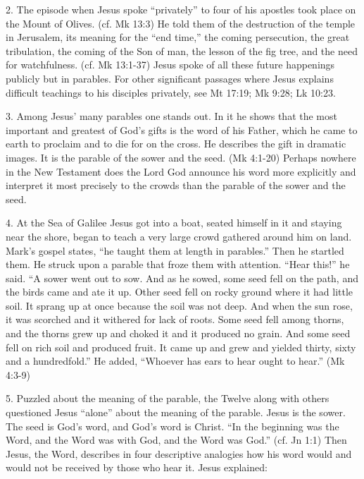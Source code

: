\documentclass[oneside]{book}
\begin{document}
2. The episode when Jesus spoke ``privately'' to four of his apostles took place
on the Mount of Olives. (cf. Mk 13:3) He told them of the destruction of the
temple in Jerusalem, its meaning for the ``end time,'' the coming persecution,
the great tribulation, the coming of the Son of man, the lesson of the fig tree,
and the need for watchfulness. (cf. Mk 13:1-37) Jesus spoke of all these future
happenings publicly but in parables. For other significant passages where Jesus
explains difficult teachings to his disciples privately, see Mt 17:19; Mk 9:28;
Lk 10:23.

3. Among Jesus' many parables one stands out. In it he shows that the most
important and greatest of God's gifts is the word of his Father, which he came
to earth to proclaim and to die for on the cross. He describes the gift in
dramatic images. It is the parable of the sower and the seed. (Mk 4:1-20)
Perhaps nowhere in the New Testament does the Lord God announce his word more
explicitly and interpret it most precisely to the crowds than the parable of the
sower and the seed.


4. At the Sea of Galilee Jesus got into a boat, seated himself in it and staying
near the shore, began to teach a very large crowd gathered around him on
land. Mark's gospel states, ``he taught them at length in parables.'' Then he
startled them. He struck upon a parable that froze them with attention. ``Hear
this!'' he said. ``A sower went out to sow. And as he sowed, some seed fell on
the path, and the birds came and ate it up. Other seed fell on rocky ground
where it had little soil. It sprang up at once because the soil was not
deep. And when the sun rose, it was scorched and it withered for lack of
roots. Some seed fell among thorns, and the thorns grew up and choked it and it
produced no grain. And some seed fell on rich soil and produced fruit. It came
up and grew and yielded thirty, sixty and a hundredfold.'' He added, ``Whoever
has ears to hear ought to hear.'' (Mk 4:3-9)

5. Puzzled about the meaning of the parable, the Twelve along with others
questioned Jesus ``alone'' about the meaning of the parable. Jesus is the
sower. The seed is God's word, and God's word is Christ. ``In the beginning was
the Word, and the Word was with God, and the Word was God.'' (cf. Jn 1:1) Then
Jesus, the Word, describes in four descriptive analogies how his word would and
would not be received by those who hear it. Jesus explained:
\end{document}
